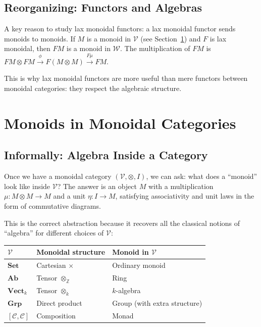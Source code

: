 \subsection{Reorganizing: Functors and Algebras}

A key reason to study lax monoidal functors: a lax monoidal functor sends monoids
to monoids. If $M$ is a monoid in $\mathcal{V}$ (see Section~\ref{sec:monoids-in-monoidal})
and $F$ is lax monoidal, then $FM$ is a monoid in $\mathcal{W}$. The multiplication
of $FM$ is $FM \otimes FM \xrightarrow{\phi} F(M \otimes M) \xrightarrow{F\mu} FM$.

This is why lax monoidal functors are more useful than mere functors between
monoidal categories: they respect the algebraic structure.


\section{Monoids in Monoidal Categories}
\label{sec:monoids-in-monoidal}

\subsection{Informally: Algebra Inside a Category}

Once we have a monoidal category $(\mathcal{V}, \otimes, I)$, we can ask: what
does a ``monoid'' look like inside $\mathcal{V}$? The answer is an object $M$
with a multiplication $\mu : M \otimes M \to M$ and a unit $\eta : I \to M$,
satisfying associativity and unit laws in the form of commutative diagrams.

This is the correct abstraction because it recovers all the classical notions
of ``algebra'' for different choices of $\mathcal{V}$:

\begin{center}
\begin{tabular}{lll}
$\mathcal{V}$ & Monoidal structure & Monoid in $\mathcal{V}$ \\
\hline
$\mathbf{Set}$ & Cartesian $\times$ & Ordinary monoid \\
$\mathbf{Ab}$ & Tensor $\otimes_\mathbb{Z}$ & Ring \\
$\mathbf{Vect}_k$ & Tensor $\otimes_k$ & $k$-algebra \\
$\mathbf{Grp}$ & Direct product & Group (with extra structure) \\
$[\mathcal{C}, \mathcal{C}]$ & Composition & Monad \\
\end{tabular}
\end{center}

